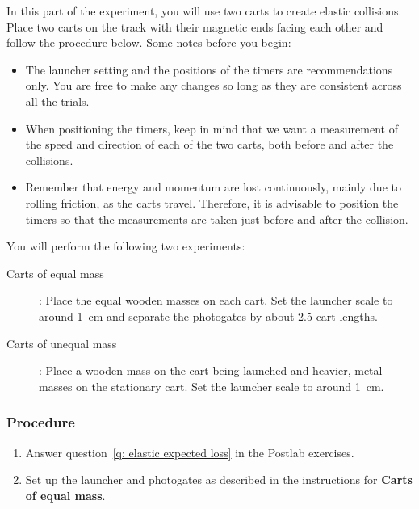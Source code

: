 \documentclass[addpoints]{physlabs}
\begin{document}
\begin{labsection}
\begin{experiment}
    In this part of the experiment, you will use two carts to create elastic collisions. Place two carts on the track with their magnetic ends facing each other and follow the procedure below. Some notes before you begin:

    \begin{itemize}
        \item The launcher setting and the positions of the timers are recommendations only. You are free to make any changes so long as they are consistent across all the trials.
        
        \item When positioning the timers, keep in mind that we want a measurement of the speed and direction of each of the two carts, both before and after the collisions.
        
        \item Remember that energy and momentum are lost continuously, mainly due to rolling friction, as the carts travel. Therefore, it is advisable to position the timers so that the measurements are taken just before and after the collision.
    \end{itemize}

    \noindent
    You will perform the following two experiments:
    \begin{description}
        \item[Carts of equal mass]: Place the equal wooden masses on each cart. Set the launcher scale to around \qty{1}{\centi\meter} and separate the photogates by about 2.5 cart lengths.

        \item[Carts of unequal mass]: Place a wooden mass on the cart being launched and heavier, metal masses on the stationary cart. Set the launcher scale to around \qty{1}{\centi\meter}.
    \end{description}

    \subsubsection*{Procedure}

    \begin{enumerate}
        \item Answer question~\ref{q: elastic expected loss} in the Postlab exercises.

        \item Set up the launcher and photogates as described in the instructions for \textbf{Carts of equal mass}.


\end{enumerate}
\end{experiment}
\end{labsection}
\end{document}
